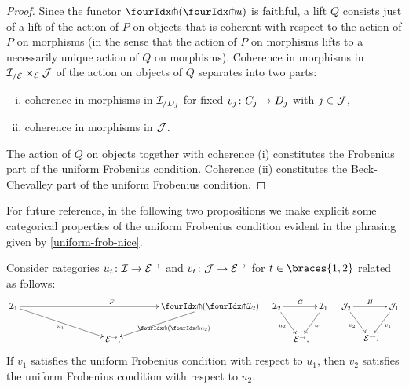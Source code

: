 \documentclass[reqno,10pt,a4paper,oneside,draft]{amsart}
\begin{document}
\begin{proof}
Since the functor $\liftl{(\liftr{u})}$ is faithful, a lift $Q$ consists just of a lift of the action of $P$ on objects that is coherent with respect to the action of $P$ on morphisms (in the sense that the action of $P$ on morphisms lifts to a necessarily unique action of $Q$ on morphisms).
Coherence in morphisms in $\cal{I}_{/\cal{E}} \times_{\cal{E}} \cal{J}$ of the action on objects of $Q$ separates into two parts:
\begin{enumerate}[(i)]
\item coherence in morphisms in $\cal{I}_{/D_j}$ for fixed $v_j \co C_j \to D_j$ with $j \in \cal{J}$,
\item coherence in morphisms in $\cal{J}$.
\end{enumerate}
The action of $Q$ on objects together with coherence (i) constitutes the Frobenius part of the uniform Frobenius condition.
Coherence (ii) constitutes the Beck-Chevalley part of the uniform Frobenius condition.
\end{proof}

For future reference,  in the following two propositions we make explicit some categorical properties of the uniform Frobenius condition evident in the phrasing given by \cref{uniform-frob-nice}.

\begin{proposition} \label{uniform-frobenius-functorial}
Consider categories $u_t \co \cal{I} \to \cal{E}^\to$ and $v_t \co \cal{J} \to \cal{E}^\to$ for $t \in \braces{1, 2}$ related as follows:
\begin{align*}
\xymatrix@!C@C-3em{
  \cal{I}_1
  \ar[rr]^{F}
  \ar[dr]_{u_1}
&&
  \liftl{(\liftr{\cal{I}_2})}
  \ar[dl]^{\liftl{(\liftr{u_2})}}
\\&
  \catE^\to
\rlap{,}}
&&
\xymatrix@C-1.5em{
  \cal{I}_2
  \ar[rr]^-{G}
  \ar[dr]_{u_2}
&&
  \cal{I}_1
  \ar[dl]^{u_1}
\\&
  \catE^\to
\rlap{,}}
&&
\xymatrix@C-1.5em{
  \cal{J}_2
  \ar[rr]^-{H}
  \ar[dr]_{v_2}
&&
  \cal{J}_1
  \ar[dl]^{v_1}
\\&
  \catE^\to
\rlap{.}}
\end{align*}
If $v_1$ satisfies the uniform Frobenius condition with respect to $u_1$, then
$v_2$ satisfies the uniform Frobenius condition with respect to $u_2$.
\end{proposition}
\end{document}
